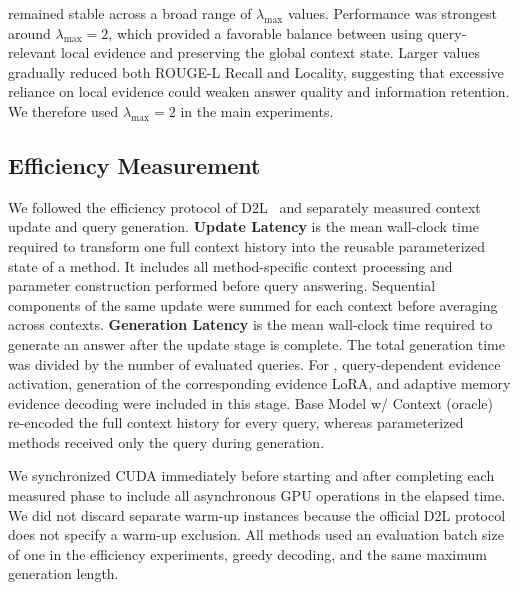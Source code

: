 \method{} remained stable across a broad range of $\lambda_{\max}$ values. Performance was strongest around $\lambda_{\max}=2$, which provided a favorable balance between using query-relevant local evidence and preserving the global context state. Larger values gradually reduced both ROUGE-L Recall and Locality, suggesting that excessive reliance on local evidence could weaken answer quality and information retention. We therefore used $\lambda_{\max}=2$ in the main experiments.





\subsection{Efficiency Measurement}
\label{app:efficiency-measurement}

We followed the efficiency protocol of D2L~\citep{charakorn2026doc} and separately measured context update and query generation. \textbf{Update Latency} is the mean wall-clock time required to transform one full context history into the reusable parameterized state of a method. It includes all method-specific context processing and parameter construction performed before query answering. Sequential components of the same update were summed for each context before averaging across contexts. \textbf{Generation Latency} is the mean wall-clock time required to generate an answer after the update stage is complete. The total generation time was divided by the number of evaluated queries. For \method{}, query-dependent evidence activation, generation of the corresponding evidence LoRA, and adaptive memory evidence decoding were included in this stage. Base Model w/ Context (oracle) re-encoded the full context history for every query, whereas parameterized methods received only the query during generation.

We synchronized CUDA immediately before starting and after completing each measured phase to include all asynchronous GPU operations in the elapsed time. We did not discard separate warm-up instances because the official D2L protocol does not specify a warm-up exclusion. All methods used an evaluation batch size of one in the efficiency experiments, greedy decoding, and the same maximum generation length.

